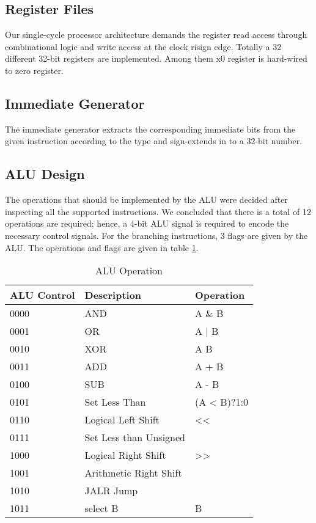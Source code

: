 \documentclass[12pt]{article}
\begin{document}
    \subsection{Register Files}
    Our single-cycle processor architecture demands the register read access through combinational logic and write access at the clock risign edge.
    Totally a 32 different 32-bit registers are implemented.
    Among them x0 register is hard-wired to zero register.
    \subsection{Immediate Generator}
    The immediate generator extracts the corresponding immediate bits from the given instruction according to the type and sign-extends in to a 32-bit number.
    \subsection{ALU Design}
    The operations that should be implemented by the ALU were decided after inspecting all the supported instructions.
    We concluded that there is a total of 12 operations are required;
    hence, a 4-bit ALU signal is required to encode the necessary control signals.
    For the branching instructions, 3 flags are given by the ALU.
    The operations and flags are given in table \ref{table:alu_operations}.
    \newpage
    \begin{table}[ht]
        \centering
        \begin{tabular}{ | m{6cm} | m{6cm}| m{4cm} | }
            \midrule
            \textbf{ALU Control} & \textbf{Description} & \textbf{Operation}\\
            \midrule
            0000 & AND & A \& B \\
            \midrule
            0001 & OR & A $|$ B \\
            \midrule
            0010 & XOR & A  B \\
            \midrule
            0011 & ADD & A + B\\
            \midrule
            0100 & SUB & A - B\\
            \midrule
            0101 & Set Less Than & (A \textless{} B)?1:0\\
            \midrule
            0110 & Logical Left Shift &  \textless{}\textless{} \\
            \midrule
            0111 & Set Less than Unsigned &  \\
            \midrule
            1000 & Logical Right Shift & \textgreater{}\textgreater{}\\
            \midrule
            1001 & Arithmetic Right Shift & \\
            \midrule
            1010 & JALR Jump &  \\
            \midrule
            1011 & select B & B \\
            \midrule
        \end{tabular}
        \caption{ALU Operation}
        \label{table:alu_operations}
    \end{table}
\end{document}
